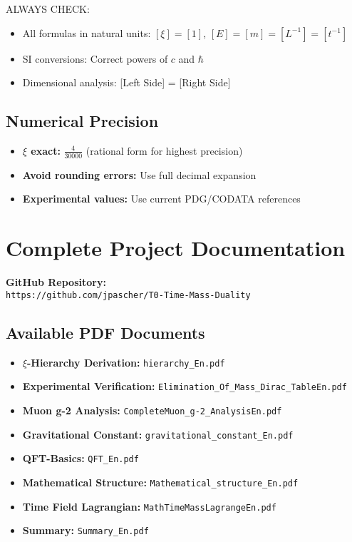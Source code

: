 \documentclass[12pt,a4paper]{article}
\begin{document}
	ALWAYS CHECK:
	\begin{itemize}
		\item All formulas in natural units: \([\xi] = [1]\), \([E] = [m] = [L^{-1}] = [t^{-1}]\)
		\item SI conversions: Correct powers of \(c\) and \(\hbar\)
		\item Dimensional analysis: [Left Side] = [Right Side]
	\end{itemize}
	
	\subsection{Numerical Precision}
	
	\begin{itemize}
		\item \textbf{\(\xi\) exact:} \(\frac{4}{30000}\) (rational form for highest precision)
		\item \textbf{Avoid rounding errors:} Use full decimal expansion
		\item \textbf{Experimental values:} Use current PDG/CODATA references
	\end{itemize}
	
	\section{Complete Project Documentation}
	
	\textbf{GitHub Repository:}\\
	\texttt{https://github.com/jpascher/T0-Time-Mass-Duality}
	
	\subsection{Available PDF Documents}
	
	\begin{itemize}
		\item \textbf{\(\xi\)-Hierarchy Derivation:} \texttt{hierarchy\_En.pdf}
		\item \textbf{Experimental Verification:} \texttt{Elimination\_Of\_Mass\_Dirac\_TableEn.pdf}
		\item \textbf{Muon g-2 Analysis:} \texttt{CompleteMuon\_g-2\_AnalysisEn.pdf}
		\item \textbf{Gravitational Constant:} \texttt{gravitational\_constant\_En.pdf}
		\item \textbf{QFT-Basics:} \texttt{QFT\_En.pdf}
		\item \textbf{Mathematical Structure:} \texttt{Mathematical\_structure\_En.pdf}
		\item \textbf{Time Field Lagrangian:} \texttt{MathTimeMassLagrangeEn.pdf}
		\item \textbf{Summary:} \texttt{Summary\_En.pdf}
	\end{itemize}
	
\end{document}
